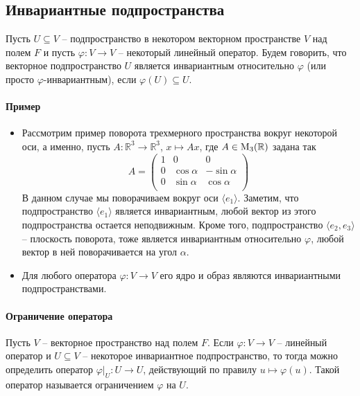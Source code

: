 \subsection{Инвариантные подпространства}

Пусть $U\subseteq V$ -- подпространство в некотором векторном пространстве $V$ над полем $F$ и пусть $\varphi\colon V\to V$ -- некоторый линейный оператор.
Будем говорить, что векторное подпространство $U$ является инвариантным относительно $\varphi$ (или просто $\varphi$-инвариантным), если $\varphi(U)\subseteq U$.

\paragraph{Пример}

\begin{itemize}
\item Рассмотрим пример поворота трехмерного пространства вокруг некоторой оси, а именно, пусть $A\colon \mathbb R^3 \to \mathbb R^3$, $x\mapsto Ax$, где $A\in \operatorname{M}_{3}(\mathbb R)$ задана так
\[
A = 
\begin{pmatrix}
{1}&{0}&{0}\\
{0}&{\cos \alpha}&{-\sin \alpha}\\
{0}&{\sin \alpha}&{\cos \alpha}\\
\end{pmatrix}
\]
В данном случае мы поворачиваем вокруг оси $\langle e_1 \rangle$.
Заметим, что подпространство $\langle e_1\rangle$ является инвариантным, любой вектор из этого подпространства остается неподвижным.
Кроме того, подпространство $\langle e_2, e_3\rangle$ -- плоскость поворота, тоже является инвариантным относительно $\varphi$, любой вектор в ней поворачивается на угол $\alpha$.

\item Для любого оператора $\varphi \colon V\to V$ его ядро и образ являются инвариантными подпространствами.
\end{itemize}

\paragraph{Ограничение оператора} 

\begin{definition}
Пусть $V$ -- векторное пространство над полем $F$.
Если $\varphi \colon V\to V$ -- линейный оператор и $U\subseteq V$ -- некоторое инвариантное подпространство, то тогда можно определить оператор $\varphi|_U\colon U\to U$, действующий по правилу $u\mapsto \varphi(u)$.
Такой оператор называется ограничением $\varphi$ на $U$.
\end{definition}

